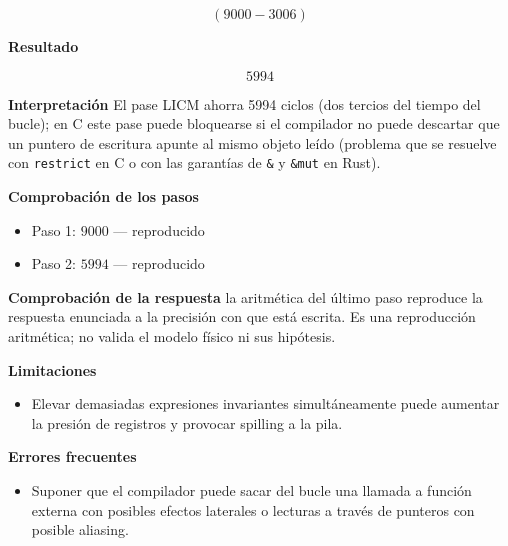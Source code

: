 \documentclass{book}
\begin{document}
\begin{tcolorbox}[title={Problema resuelto}, studiumworked, breakable]
\begin{enumerate}
\[
\left(9000-3006\right)
\]
\end{enumerate}

\noindent\textbf{Resultado}

\[
5994
\]

\noindent\textbf{Interpretación}
El pase LICM ahorra 5994 ciclos (dos tercios del tiempo del bucle); en C este pase puede bloquearse si el compilador no puede descartar que un puntero de escritura apunte al mismo objeto leído (problema que se resuelve con \texttt{restrict} en C o con las garantías de \texttt{\&} y \texttt{\&mut} en Rust).

\noindent\textbf{Comprobación de los pasos}
\begin{itemize}
\item Paso 1: $9000$ — reproducido
\item Paso 2: $5994$ — reproducido
\end{itemize}

\noindent\textbf{Comprobación de la respuesta} la aritmética del último paso reproduce la respuesta enunciada a la precisión con que está escrita. Es una reproducción aritmética; no valida el modelo físico ni sus hipótesis.

\noindent\textbf{Limitaciones}
\begin{itemize}
\item Elevar demasiadas expresiones invariantes simultáneamente puede aumentar la presión de registros y provocar spilling a la pila.
\end{itemize}

\noindent\textbf{Errores frecuentes}
\begin{itemize}
\item Suponer que el compilador puede sacar del bucle una llamada a función externa con posibles efectos laterales o lecturas a través de punteros con posible aliasing.
\end{itemize}
\end{tcolorbox}
\end{document}
